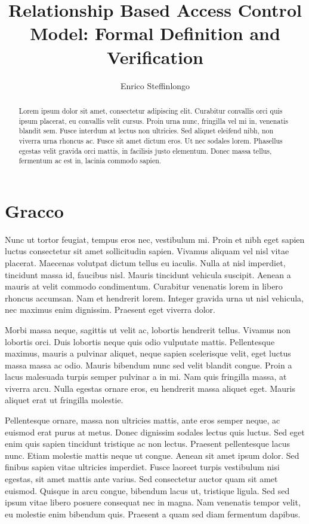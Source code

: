 \documentclass[10pt]{llncs}
\author{Enrico Steffinlongo}
\institute{Universit\`{a} Ca' Foscari Venezia}
\title{Relationship Based Access Control Model: Formal Definition and Verification}
\begin{document}
\maketitle
\begin{abstract}
Lorem ipsum dolor sit amet, consectetur adipiscing elit. Curabitur convallis orci quis ipsum placerat, eu convallis velit cursus. Proin urna nunc, fringilla vel mi in, venenatis blandit sem. Fusce interdum at lectus non ultricies. Sed aliquet eleifend nibh, non viverra urna rhoncus ac. Fusce sit amet dictum eros. Ut nec sodales lorem. Phasellus egestas velit gravida orci mattis, in facilisis justo elementum. Donec massa tellus, fermentum ac est in, lacinia commodo sapien.
\end{abstract}

\section{Gracco}
Nunc ut tortor feugiat, tempus eros nec, vestibulum mi. Proin et nibh eget sapien luctus consectetur sit amet sollicitudin sapien. Vivamus aliquam vel nisl vitae placerat. Maecenas volutpat dictum tellus eu iaculis. Nulla at nisl imperdiet, tincidunt massa id, faucibus nisl. Mauris tincidunt vehicula suscipit. Aenean a mauris at velit commodo condimentum. Curabitur venenatis lorem in libero rhoncus accumsan. Nam et hendrerit lorem. Integer gravida urna ut nisl vehicula, nec maximus enim dignissim. Praesent eget viverra dolor.

Morbi massa neque, sagittis ut velit ac, lobortis hendrerit tellus. Vivamus non lobortis orci. Duis lobortis neque quis odio vulputate mattis. Pellentesque maximus, mauris a pulvinar aliquet, neque sapien scelerisque velit, eget luctus massa massa ac odio. Mauris bibendum nunc sed velit blandit congue. Proin a lacus malesuada turpis semper pulvinar a in mi. Nam quis fringilla massa, at viverra arcu. Nulla egestas ornare eros, eu hendrerit massa aliquet eget. Mauris aliquet erat ut fringilla molestie.

Pellentesque ornare, massa non ultricies mattis, ante eros semper neque, ac euismod erat purus at metus. Donec dignissim sodales lectus quis luctus. Sed eget enim quis sapien tincidunt tristique ac non lectus. Praesent pellentesque lacus nunc. Etiam molestie mattis neque ut congue. Aenean sit amet ipsum dolor. Sed finibus sapien vitae ultricies imperdiet. Fusce laoreet turpis vestibulum nisi egestas, sit amet mattis ante varius. Sed consectetur auctor quam sit amet euismod. Quisque in arcu congue, bibendum lacus ut, tristique ligula. Sed sed ipsum vitae libero posuere consequat nec in magna. Nam venenatis tempor velit, eu molestie enim bibendum quis. Praesent a quam sed diam fermentum dapibus.
\end{document}
